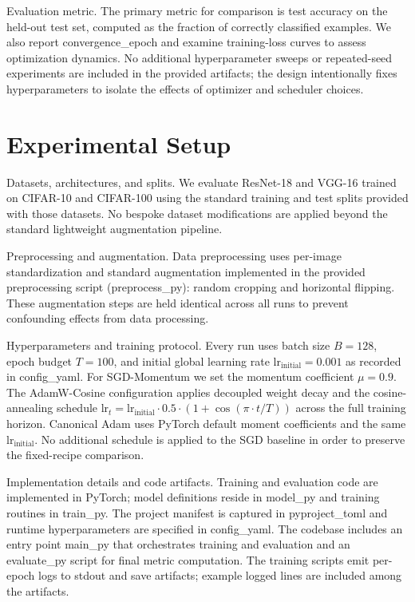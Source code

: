 \documentclass[journal,article,submit,pdftex,moreauthors]{Definitions/mdpi}
\begin{document}
Evaluation metric. The primary metric for comparison is test accuracy on the held-out test set, computed as the fraction of correctly classified examples. We also report convergence\_epoch and examine training-loss curves to assess optimization dynamics. No additional hyperparameter sweeps or repeated-seed experiments are included in the provided artifacts; the design intentionally fixes hyperparameters to isolate the effects of optimizer and scheduler choices.

\section{Experimental Setup}

Datasets, architectures, and splits. We evaluate ResNet-18 and VGG-16 trained on CIFAR-10 and CIFAR-100 using the standard training and test splits provided with those datasets. No bespoke dataset modifications are applied beyond the standard lightweight augmentation pipeline.

Preprocessing and augmentation. Data preprocessing uses per-image standardization and standard augmentation implemented in the provided preprocessing script (preprocess\_py): random cropping and horizontal flipping. These augmentation steps are held identical across all runs to prevent confounding effects from data processing.

Hyperparameters and training protocol. Every run uses batch size $B = 128$, epoch budget $T = 100$, and initial global learning rate $\mathrm{lr}_{\mathrm{initial}} = 0.001$ as recorded in config\_yaml. For SGD-Momentum we set the momentum coefficient $\mu = 0.9$. The AdamW-Cosine configuration applies decoupled weight decay and the cosine-annealing schedule $\mathrm{lr}_t = \mathrm{lr}_{\mathrm{initial}} \cdot 0.5 \cdot (1 + \cos(\pi \cdot t / T))$ across the full training horizon. Canonical Adam uses PyTorch default moment coefficients and the same $\mathrm{lr}_{\mathrm{initial}}$. No additional schedule is applied to the SGD baseline in order to preserve the fixed-recipe comparison.

Implementation details and code artifacts. Training and evaluation code are implemented in PyTorch; model definitions reside in model\_py and training routines in train\_py. The project manifest is captured in pyproject\_toml and runtime hyperparameters are specified in config\_yaml. The codebase includes an entry point main\_py that orchestrates training and evaluation and an evaluate\_py script for final metric computation. The training scripts emit per-epoch logs to stdout and save artifacts; example logged lines are included among the artifacts.
\end{document}
